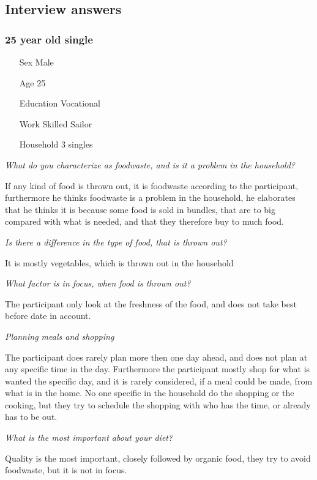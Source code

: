 \subsection{Interview answers}
\subsubsection{25 year old single}
\begin{itemize}
  \item[Sex] Male
  \item[Age] 25
  \item[Education] Vocational
  \item[Work] Skilled Sailor
  \item[Household] 3 singles
\end{itemize}
\emph{What do you characterize as foodwaste, and is it a problem in the household?}

If any kind of food is thrown out, it is foodwaste according to the participant, furthermore he thinks foodwaste is a problem in the household, he elaborates that he thinks it is because some food is sold in bundles, that are to big compared with what is needed, and that they therefore buy to much food.

\emph{Is there a difference in the type of food, that is thrown out?}

It is mostly vegetables, which is thrown out in the household

\emph{What factor is in focus, when food is thrown out?}

The participant only look at the freshness of the food, and does not take best before date in account.

\emph{Planning meals and shopping}

The participant does rarely plan more then one day ahead, and does not plan at any specific time in the day. Furthermore the participant mostly shop for what is wanted the specific day, and it is rarely considered, if a meal could be made, from what is in the home. No one specific in the household do the shopping or the cooking, but they try to schedule the shopping with who has the time, or already has to be out.

\emph{What is the most important about your diet?}

Quality is the most important, closely followed by organic food, they try to avoid foodwaste, but it is not in focus.

